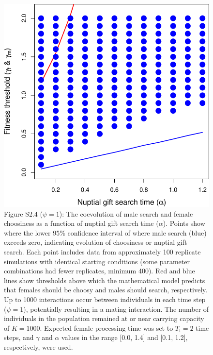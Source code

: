 \documentclass[
]{article}
\begin{document}
\clearpage

\captionsetup{labelformat=empty}

\begin{figure}
\centering
\includegraphics{SI_files/figure-latex/unnamed-chunk-5-1.pdf}
\caption{Figure S2.4 (\(\psi = 1\)): The coevolution of male search and
female choosiness as a function of nuptial gift search time
(\(\alpha\)). Points show where the lower 95\% confidence interval of
where male search (blue) exceeds zero, indicating evolution of
choosiness or nuptial gift search. Each point includes data from
approximately 100 replicate simulations with identical starting
conditions (some parameter combinations had fewer replicates, minimum
400). Red and blue lines show thresholds above which the mathematical
model predicts that females should be choosy and males should search,
respectively. Up to 1000 interactions occur between individuals in each
time step (\(\psi = 1\)), potentially resulting in a mating interaction.
The number of individuals in the population remained at or near carrying
capacity of \(K = 1000\). Expected female processing time was set to
\(T_{\mathrm{f}}=2\) time steps, and \(\gamma\) and \(\alpha\) values in
the range {[}0.0, 1.4{]} and {[}0.1, 1.2{]}, respectively, were used.}
\end{figure}

\captionsetup{labelformat=default}
\end{document}

